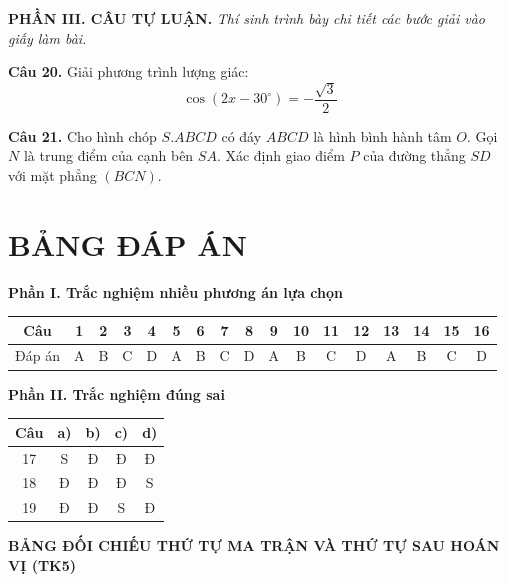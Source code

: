 \documentclass[12pt, a4paper]{article}
\newcommand{\cau}[1]{\vspace{0.12cm}\noindent\textbf{Câu #1. }}
\newcommand{\PhanIII}{
\vspace{0.3cm}
\noindent\textbf{\large\sffamily PHẦN III. CÂU TỰ LUẬN.}
\textit{Thí sinh trình bày chi tiết các bước giải vào giấy làm bài.}\par\vspace{0.2cm}
}
\newcommand{\filllines}[1]{}
\begin{document}
\PhanIII

\cau{20} Giải phương trình lượng giác:
$$\cos(2x - 30^\circ) = -\dfrac{\sqrt{3}}{2}$$
\filllines{5}

\cau{21} Cho hình chóp $S.ABCD$ có đáy $ABCD$ là hình bình hành tâm $O$. Gọi $N$ là trung điểm của cạnh bên $SA$. Xác định giao điểm $P$ của đường thẳng $SD$ với mặt phẳng $(BCN)$.
\filllines{6}

\clearpage
\section*{BẢNG ĐÁP ÁN}
\noindent\textbf{Phần I. Trắc nghiệm nhiều phương án lựa chọn}
\begin{center}
\small
\renewcommand{\arraystretch}{1.2}
\begin{tabular}{c|*{16}{c|}}
Câu & 1 & 2 & 3 & 4 & 5 & 6 & 7 & 8 & 9 & 10 & 11 & 12 & 13 & 14 & 15 & 16 \\\hline
Đáp án & A & B & C & D & A & B & C & D & A & B & C & D & A & B & C & D \\
\end{tabular}
\end{center}
\noindent\textbf{Phần II. Trắc nghiệm đúng sai}
\begin{center}
\small
\renewcommand{\arraystretch}{1.2}
\begin{tabular}{c|c|c|c|c}
Câu & a) & b) & c) & d) \\\hline
17 & S & Đ & Đ & Đ \\
18 & Đ & Đ & Đ & S \\
19 & Đ & Đ & S & Đ \\
\end{tabular}
\end{center}

\vspace{0.3cm}
\noindent\textbf{BẢNG ĐỐI CHIẾU THỨ TỰ MA TRẬN VÀ THỨ TỰ SAU HOÁN VỊ (TK5)}
\begin{center}
\footnotesize
\renewcommand{\arraystretch}{1.15}

\vspace{0.25cm}
\end{center}
\end{document}

